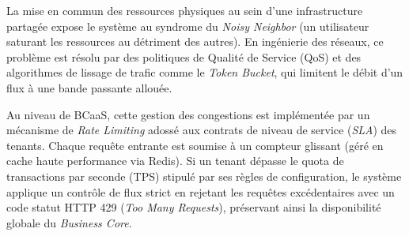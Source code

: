 \begin{analogie}
La mise en commun des ressources physiques au sein d'une infrastructure partagée expose le système au syndrome du \emph{Noisy Neighbor} (un utilisateur saturant les ressources au détriment des autres). En ingénierie des réseaux, ce problème est résolu par des politiques de Qualité de Service (QoS) et des algorithmes de lissage de trafic comme le \emph{Token Bucket}, qui limitent le débit d'un flux à une bande passante allouée.

Au niveau de BCaaS, cette gestion des congestions est implémentée par un mécanisme de \emph{Rate Limiting} adossé aux contrats de niveau de service (\emph{SLA}) des tenants. Chaque requête entrante est soumise à un compteur glissant (géré en cache haute performance via Redis). Si un tenant dépasse le quota de transactions par seconde (TPS) stipulé par ses règles de configuration, le système applique un contrôle de flux strict en rejetant les requêtes excédentaires avec un code statut HTTP 429 (\emph{Too Many Requests}), préservant ainsi la disponibilité globale du \emph{Business Core}.
\end{analogie}



